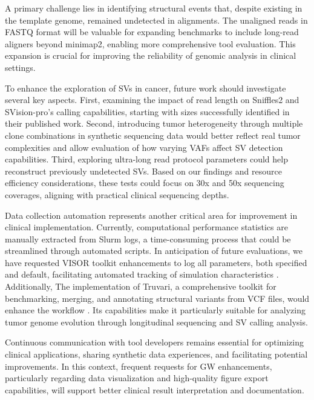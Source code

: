 
A primary challenge lies in identifying structural events that, despite 
existing in the template genome, remained undetected in alignments. The 
unaligned reads in FASTQ format will be valuable for expanding benchmarks to 
include long-read aligners beyond minimap2, enabling more comprehensive tool 
evaluation. This expansion is crucial for improving the reliability of genomic 
analysis in clinical settings.

To enhance the exploration of SVs in cancer, future work should investigate 
several key aspects. First, examining the impact of read length on Sniffles2 and 
SVision-pro's calling capabilities, starting with sizes successfully identified 
in their published work. Second, introducing tumor heterogeneity through 
multiple clone combinations in synthetic sequencing data would better reflect 
real tumor complexities and allow evaluation of how varying VAFs affect SV 
detection capabilities. Third, exploring ultra-long read protocol parameters 
could help reconstruct previously undetected SVs. Based on our findings and 
resource efficiency considerations, these tests could focus on 30x and 50x 
sequencing coverages, aligning with practical clinical sequencing depths.

Data collection automation represents another critical area for improvement in 
clinical implementation. Currently, computational performance statistics are 
manually extracted from Slurm logs, a time-consuming process that could be 
streamlined through automated scripts. In anticipation of future evaluations, 
we have requested VISOR toolkit enhancements to log all parameters, both 
specified and default, facilitating automated tracking of simulation 
characteristics \cite{noauthor_add_nodate}. Additionally, The implementation of 
Truvari, a comprehensive toolkit for benchmarking, merging, 
and annotating structural variants from VCF files, would enhance the workflow
\cite{english_truvari_2022}. Its capabilities make it 
particularly suitable for analyzing tumor genome evolution through longitudinal 
sequencing and SV calling analysis.

Continuous communication with tool developers remains essential for optimizing 
clinical applications, sharing synthetic data experiences, and facilitating 
potential improvements. In this context, frequent requests for GW enhancements, 
particularly regarding data visualization and high-quality figure export 
capabilities, will support better clinical result interpretation and 
documentation.

